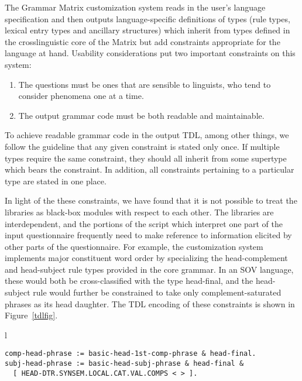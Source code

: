 \documentclass[11pt]{article}
\begin{document}
The Grammar Matrix customization system reads in the user's language
specification and then outputs language-specific definitions of types
(rule types, lexical entry types and ancillary structures) which
inherit from types defined in the crosslinguistic core of the Matrix
but add constraints appropriate for the language at hand. 
Usability considerations put two important constraints on this system:

\begin{enumerate}
\item The questions must be ones that are sensible to linguists,
who tend to consider phenomena one at a time.  
\item The output grammar code must be both readable and maintainable.
\end{enumerate}
%
To achieve readable grammar code in the output TDL, among other
things, we follow the guideline that any given constraint is
stated only once.  If multiple types require the same constraint, they
should all inherit from some supertype which bears the constraint.
In addition, all constraints pertaining to a particular type are
stated in one place.

In light of the these constraints, we
have found that it is not possible to treat the libraries as black-box
modules with respect to each other.  The libraries are interdependent,
and the portions of the script which interpret one part of the input
questionnaire frequently need to make reference to information
elicited by other parts of the questionnaire.  For example, the
customization system implements major constituent word order by
specializing the head-complement and head-subject rule types provided
in the core grammar.  In an SOV language, these would both be
cross-classified with the type head-final, and the head-subject rule
would further be constrained to take only complement-saturated phrases
as its head daughter.  The TDL encoding of these constraints is shown
in Figure~\ref{tdlfig}.

\begin{figure*}[ht]
\small
\begin{center}
\begin{tabular}{l}
\begin{minipage}{5in}
\begin{verbatim}
comp-head-phrase := basic-head-1st-comp-phrase & head-final.
subj-head-phrase := basic-head-subj-phrase & head-final &
  [ HEAD-DTR.SYNSEM.LOCAL.CAT.VAL.COMPS < > ].
\end{verbatim}
\end{minipage}\\
\end{tabular}
\end{center}
\caption{Specialized phrase structure rule types for SOV language}
\label{tdlfig}
\end{figure*}
\end{document}

